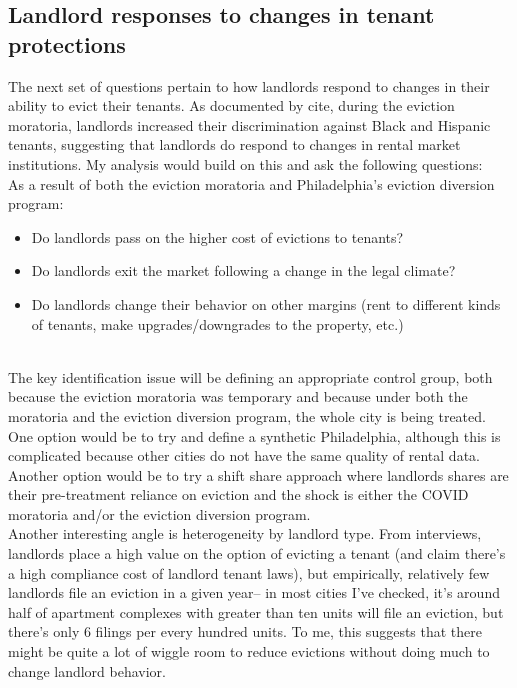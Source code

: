 \documentclass{article}
\begin{document}
\subsection{Landlord responses to changes in tenant protections}

The next set of questions pertain to how landlords respond to changes in their ability to evict their tenants. As documented by cite, during the eviction moratoria, landlords increased their discrimination against Black and Hispanic tenants, suggesting that landlords do respond to changes in rental market institutions. My analysis would build on this and ask the following questions:\\

As a result of both the eviction moratoria and Philadelphia's eviction diversion program:\\


\begin{itemize}
    \item Do landlords pass on the higher cost of evictions to tenants?
    \item Do landlords exit the market following a change in the legal climate?
    \item Do landlords change their behavior on other margins (rent to different kinds of tenants, make upgrades/downgrades to the property, etc.)
\end{itemize} \\

The key identification issue will be defining an appropriate control group, both because the eviction moratoria was temporary and because under both the moratoria and the eviction diversion program, the whole city is being treated. One option would be to try and define a synthetic Philadelphia, although this is complicated because other cities do not have the same quality of rental data. Another option would be to try a shift share approach where landlords shares are their pre-treatment reliance on eviction and the shock is either the COVID moratoria and/or the eviction diversion program. \\

Another interesting angle is heterogeneity by landlord type. From interviews, landlords place a high value on the option of evicting a tenant (and claim there's a high compliance cost of landlord tenant laws), but empirically, relatively few landlords file an eviction in a given year-- in most cities I've checked, it's around half of apartment complexes with greater than ten units will file an eviction, but there's only 6 filings per every hundred units. To me, this suggests that there might be quite a lot of wiggle room to reduce evictions without doing much to change landlord behavior.
\end{document}
